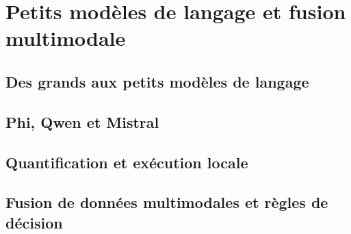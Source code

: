 
\section{Petits modèles de langage et fusion multimodale}


\subsection{Des grands aux petits modèles de langage}

\subsection{Phi, Qwen et Mistral}

\subsection{Quantification et exécution locale}

\subsection{Fusion de données multimodales et règles de décision}
